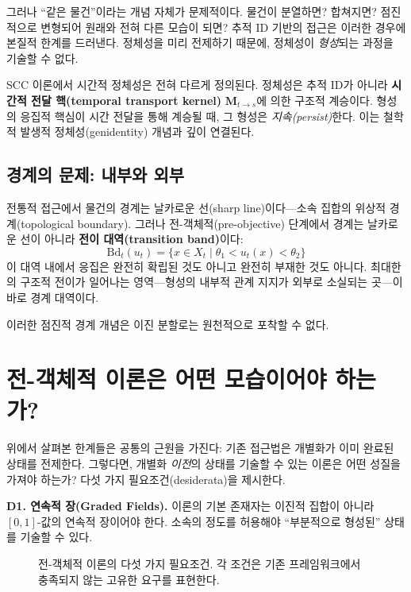 그러나 ``같은 물건''이라는 개념 자체가 문제적이다. 물건이 분열하면? 합쳐지면? 점진적으로 변형되어 원래와 전혀 다른 모습이 되면? 추적 ID 기반의 접근은 이러한 경우에 본질적 한계를 드러낸다. 정체성을 미리 전제하기 때문에, 정체성이 \emph{형성}되는 과정을 기술할 수 없다.

SCC 이론에서 시간적 정체성은 전혀 다르게 정의된다. 정체성은 추적 ID가 아니라 \textbf{시간적 전달 핵(temporal transport kernel)} $\mathbf{M}_{t \to s}$에 의한 구조적 계승이다. 형성의 응집적 핵심이 시간 전달을 통해 계승될 때, 그 형성은 \emph{지속(persist)}한다. 이는 철학적 발생적 정체성(genidentity) 개념과 깊이 연결된다.


\subsection{경계의 문제: 내부와 외부}
\label{subsec:boundary-problem}

전통적 접근에서 물건의 경계는 날카로운 선(sharp line)이다---소속 집합의 위상적 경계(topological boundary). 그러나 전-객체적(pre-objective) 단계에서 경계는 날카로운 선이 아니라 \textbf{전이 대역(transition band)}이다:
\begin{equation}
    \mathrm{Bd}_t(u_t) = \{x \in X_t \mid \theta_1 < u_t(x) < \theta_2\}
    \label{eq:boundary-band}
\end{equation}
이 대역 내에서 응집은 완전히 확립된 것도 아니고 완전히 부재한 것도 아니다. 최대한의 구조적 전이가 일어나는 영역---형성의 내부적 관계 지지가 외부로 소실되는 곳---이 바로 경계 대역이다.

이러한 점진적 경계 개념은 이진 분할로는 원천적으로 포착할 수 없다.


\section{전-객체적 이론은 어떤 모습이어야 하는가?}
\label{sec:desiderata}

위에서 살펴본 한계들은 공통의 근원을 가진다: 기존 접근법은 개별화가 이미 완료된 상태를 전제한다. 그렇다면, 개별화 \emph{이전}의 상태를 기술할 수 있는 이론은 어떤 성질을 가져야 하는가? 다섯 가지 필요조건(desiderata)을 제시한다.

\textbf{D1. 연속적 장(Graded Fields).}
이론의 기본 존재자는 이진적 집합이 아니라 $[0,1]$-값의 연속적 장이어야 한다. 소속의 정도를 허용해야 ``부분적으로 형성된'' 상태를 기술할 수 있다.

\begin{figure}[t]
\centering
{}
\caption{전-객체적 이론의 다섯 가지 필요조건. 각 조건은 기존 프레임워크에서 충족되지 않는 고유한 요구를 표현한다.}
\label{fig:five-desiderata}
\end{figure}

